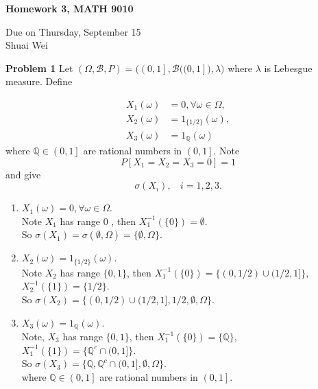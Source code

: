\documentclass{article}
\newcommand{\llb}{\mathcal{B}}
\newcommand{\bbq}{\mathbb{Q}}
\begin{document}
\begin{center}

\textbf{Homework 3, MATH 9010}

Due on Thursday, September 15\\

Shuai Wei

\end{center}

\vspace{3 mm}

\noindent \textbf{Problem 1} Let $(\Omega, \llb, P) = \Big(\left(\left.0,1\right]\right.,\llb\big((\left. 0,1\right]\big),\lambda\Big)$ where $\lambda$ is Lebesgue measure. Define

\begin{align*}
	X_1(\omega) &= 0, \forall \omega \in \Omega,\\
	X_2(\omega) &= 1_{\{1/2\}}(\omega),\\
	X_3(\omega) &= 1_{\bbq}(\omega)
\end{align*}
where $\bbq \in \left(\left.0,1\right]\right.$ are rational numbers in $\left(\left.0,1\right]\right.$. Note 
$$ P[X_1 = X_2 = X_3 = 0] = 1$$
and give 
$$ \sigma(X_i),~~~~	i = 1,2,3.$$

\begin{enumerate}
	\item
		$X_1(\omega) = 0, \forall \omega \in \Omega$.\\
		Note $X_1$ has range  0 , then $X^{-1}_{1}(\{0\}) = \emptyset$.\\
		So $\sigma(X_1) = \sigma(\emptyset, \Omega)= \{\emptyset, \Omega\}$.\\
	\item 
		$X_2(\omega) = 1_{\{1/2\}}(\omega)$.\\
	Note $X_2$ has range $\{0,1\}$, then $X^{-1}_1(\{0\}) = \{(0,1/2)\cup (1/2,1]\}$,$X^{-1}_2(\{1\}) = \{1/2\}$. \\
	So $\sigma(X_2) = \{(0,1/2)\cup (1/2,1], 1/2, \emptyset, \Omega\}$.
	\item
	$X_3(\omega) = 1_{\bbq}(\omega)$.\\
	Note, $X_3$ has range $\{0,1\}$, then $X^{-1}_1(\{0\}) = \{\bbq\}$, $X^{-1}_1(\{1\}) = \{\bbq^c \cap (0,1]\}$.\\
	So $\sigma(X_3) = \{\bbq, \bbq^c \cap (0,1], \emptyset, \Omega\}$.\\
	where $\bbq \in \left(\left.0,1\right]\right.$ are rational numbers in $\left(\left.0,1\right]\right.$.
\end{enumerate}
\end{document}
